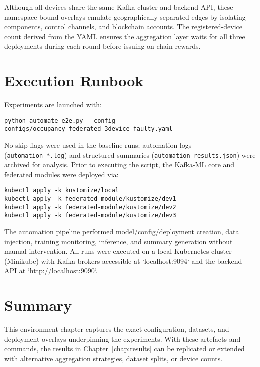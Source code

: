 Although all devices share the same Kafka cluster and backend API, these namespace-bound overlays emulate geographically separated edges by isolating components, control channels, and blockchain accounts. The registered-device count derived from the YAML ensures the aggregation layer waits for all three deployments during each round before issuing on-chain rewards.


\section{Execution Runbook}
\label{sec:execution_runbook}

Experiments are launched with:

\begin{verbatim}
python automate_e2e.py --config configs/occupancy_federated_3device_faulty.yaml
\end{verbatim}

No skip flags were used in the baseline runs; automation logs (\texttt{automation\_*.log}) and structured summaries (\texttt{automation\_results.json}) were archived for analysis. Prior to executing the script, the Kafka-ML core and federated modules were deployed via:

\begin{verbatim}
kubectl apply -k kustomize/local
kubectl apply -k federated-module/kustomize/dev1
kubectl apply -k federated-module/kustomize/dev2
kubectl apply -k federated-module/kustomize/dev3
\end{verbatim}

The automation pipeline performed model/config/deployment creation, data injection, training monitoring, inference, and summary generation without manual intervention. All runs were executed on a local Kubernetes cluster (Minikube) with Kafka brokers accessible at `localhost:9094` and the backend API at `http://localhost:9090`.

\section{Summary}

This environment chapter captures the exact configuration, datasets, and deployment overlays underpinning the experiments. With these artefacts and commands, the results in Chapter~\ref{chap:results} can be replicated or extended with alternative aggregation strategies, dataset splits, or device counts.

